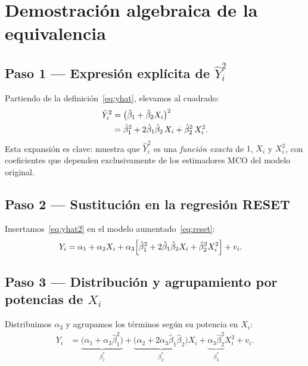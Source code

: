 \documentclass[12pt, letterpaper]{article}
\begin{document}
\section{Demostración algebraica de la equivalencia}

\subsection{Paso 1 --- Expresión explícita de $\hat{Y}_i^2$}

Partiendo de la definición~\eqref{eq:yhat}, elevamos al cuadrado:
\begin{align}
  \hat{Y}_i^2
  &= \bigl(\hat{\beta}_1 + \hat{\beta}_2 X_i\bigr)^2 \notag\\
  &= \hat{\beta}_1^2
     + 2\hat{\beta}_1\hat{\beta}_2\, X_i
     + \hat{\beta}_2^2\, X_i^2.
  \label{eq:yhat2}
\end{align}
Esta expansión es clave: muestra que $\hat{Y}_i^2$ es una
\emph{función exacta} de $1$, $X_i$ y $X_i^2$, con coeficientes que
dependen exclusivamente de los estimadores MCO del modelo original.

\subsection{Paso 2 --- Sustitución en la regresión RESET}

Insertamos~\eqref{eq:yhat2} en el modelo aumentado~\eqref{eq:reset}:
\begin{align}
  Y_i
  &= \alpha_1 + \alpha_2 X_i
     + \alpha_3\Bigl[\hat{\beta}_1^2
       + 2\hat{\beta}_1\hat{\beta}_2 X_i
       + \hat{\beta}_2^2 X_i^2\Bigr]
     + v_i.
  \label{eq:reset_expandido}
\end{align}

\subsection{Paso 3 --- Distribución y agrupamiento por potencias de $X_i$}

Distribuimos $\alpha_3$ y agrupamos los términos según su potencia
en $X_i$:
\begin{align}
  Y_i
  &= \underbrace{\bigl(\alpha_1 + \alpha_3\hat{\beta}_1^2\bigr)}_{\displaystyle\beta_1^*}
   + \underbrace{\bigl(\alpha_2 + 2\alpha_3\hat{\beta}_1\hat{\beta}_2\bigr)}_{\displaystyle\beta_2^*}
     X_i
   + \underbrace{\alpha_3\hat{\beta}_2^2}_{\displaystyle\beta_3^*}
     X_i^2
   + v_i.
  \label{eq:agrupado}
\end{align}
\end{document}
